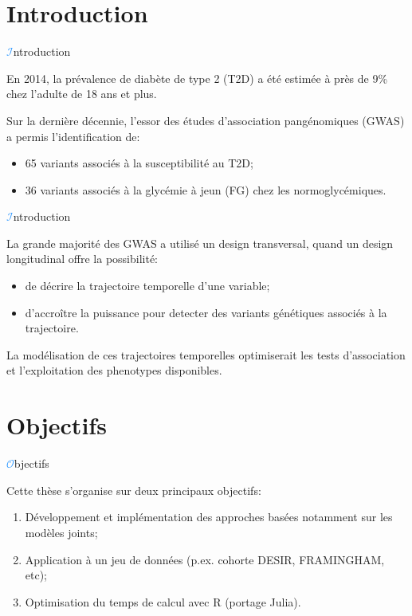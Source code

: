 \section{Introduction}
\begin{frame}{{\huge\textcolor{dodgerblue}{$\mathcal{I}$}}ntroduction}
\par{En \textcolor{springgreen3}{2014}, la prévalence de diabète de type 2 (\textcolor{springgreen3}{T2D}) a été estimée à près de
\textcolor{springgreen3}{9\%} chez l'adulte de \textcolor{springgreen3}{18} ans et plus.}
\vspace{1em}
\par{Sur la dernière décennie, l'essor des études d'association pangénomiques (\textcolor{springgreen3}{GWAS}) a permis l'identification de:
    \begin{itemize}
        \item \textcolor{springgreen3}{65} variants associés à la susceptibilité au \textcolor{springgreen3}{T2D};
        \item \textcolor{springgreen3}{36} variants associés à la glycémie à jeun (\textcolor{springgreen3}{FG}) chez les normoglycémiques.
    \end{itemize}
}
\end{frame}


\begin{frame}{{\huge\textcolor{dodgerblue}{$\mathcal{I}$}}ntroduction}
\par{La grande majorité des \textcolor{springgreen3}{GWAS} a utilisé un design transversal, quand un design longitudinal offre la possibilité:
    \begin{itemize}
        \item de décrire la trajectoire temporelle d'une variable;
        \item d'accroître la puissance pour detecter des variants génétiques associés à la trajectoire.
    \end{itemize}
}
\vspace{1em}
\par{La modélisation de ces trajectoires temporelles optimiserait les tests d'association
et l'exploitation des phenotypes disponibles.}
\end{frame}


\section{Objectifs}
\begin{frame}{{\huge\textcolor{dodgerblue}{$\mathcal{O}$}}bjectifs}
\par{Cette thèse s'organise sur deux principaux objectifs:
\begin{enumerate}
    \item Développement et implémentation des approches basées notamment sur les modèles joints;
    \item Application à un jeu de données (p.ex. cohorte \textcolor{springgreen3}{DESIR}, \textcolor{springgreen3}{FRAMINGHAM}, etc);
    \vspace{1em}
    \item Optimisation du temps de calcul avec R (portage Julia).
\end{enumerate}
}
\end{frame}


